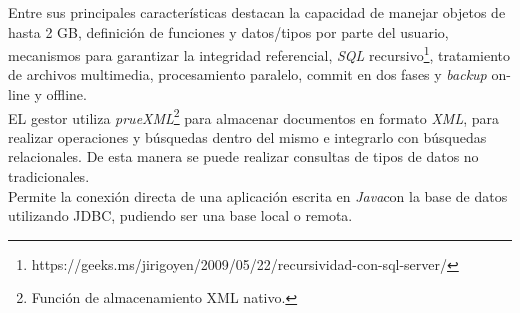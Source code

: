 \documentclass[11pt,a4paper]{article}
\begin{document}
Entre sus principales características destacan la capacidad de manejar objetos de hasta 2 GB, definición de funciones y datos/tipos por parte del usuario, mecanismos para garantizar la integridad referencial, \emph{SQL} recursivo\footnote{https://geeks.ms/jirigoyen/2009/05/22/recursividad-con-sql-server/}, tratamiento de archivos multimedia, procesamiento paralelo, commit en dos fases y \emph{backup} on-line y offline.\\

EL gestor utiliza \emph{prueXML}\footnote{Función de almacenamiento XML nativo.} para almacenar documentos en formato \emph{XML}, para realizar operaciones y búsquedas dentro del mismo e integrarlo con búsquedas relacionales.\cite{WIKI:4} De esta manera se puede realizar consultas de tipos de datos no tradicionales.\\

Permite la conexión directa de una aplicación escrita en \emph{Java}con la base de datos utilizando JDBC,  pudiendo ser una base local o remota.\cite{DB2:3}



\end{document}
